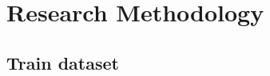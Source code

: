 \documentclass[a4paper,fleqn]{cas-sc}
\begin{document}

\section{Research Methodology}%

\subsection{Train dataset}
\end{document}
